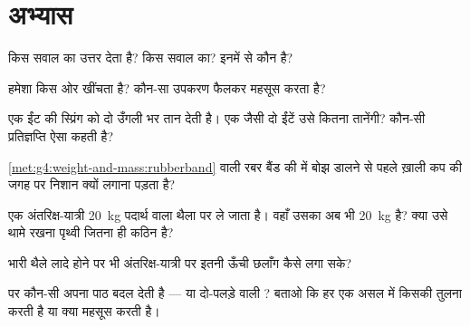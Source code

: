 \section{अभ्यास}

\begin{exercise}[$\star$]\label{exo:g4:weight-and-mass:1}
 किस सवाल का उत्तर देता है?  किस सवाल का? इनमें से 
कौन है?
\end{exercise}

\begin{exercise}[$\star$]\label{exo:g4:weight-and-mass:2}
 हमेशा किस ओर खींचता है? कौन-सा उपकरण फैलकर  महसूस करता है?
\end{exercise}

\begin{exercise}[$\star$]\label{exo:g4:weight-and-mass:3}
एक ईंट  की स्प्रिंग को दो उँगली भर तान देती है। एक जैसी
दो ईंटें उसे कितना तानेंगी? कौन-सी प्रतिज्ञप्ति ऐसा कहती है?
\end{exercise}

\begin{exercise}[$\star$]\label{exo:g4:weight-and-mass:4}
\cref{met:g4:weight-and-mass:rubberband} वाली रबर बैंड की  में
बोझ डालने से पहले ख़ाली कप की जगह पर निशान क्यों लगाना पड़ता है?
\end{exercise}

\begin{exercise}[$\star$]\label{exo:g4:weight-and-mass:5}
एक अंतरिक्ष-यात्री \qty{20}{kg} पदार्थ वाला थैला  पर ले जाता
है। वहाँ उसका  अब भी \qty{20}{kg} है? क्या उसे थामे रखना
पृथ्वी जितना ही कठिन है?
\end{exercise}

\begin{exercise}[$\star$]\label{exo:g4:weight-and-mass:6}
भारी थैले लादे होने पर भी अंतरिक्ष-यात्री  पर इतनी ऊँची छलाँग
कैसे लगा सके?
\end{exercise}

\begin{exercise}[$\star$]\label{exo:g4:weight-and-mass:7}
 पर कौन-सी  अपना पाठ बदल देती है ---  या
दो-पलड़े वाली ? बताओ कि हर एक असल में किसकी तुलना करती है या
क्या महसूस करती है।
\end{exercise}

